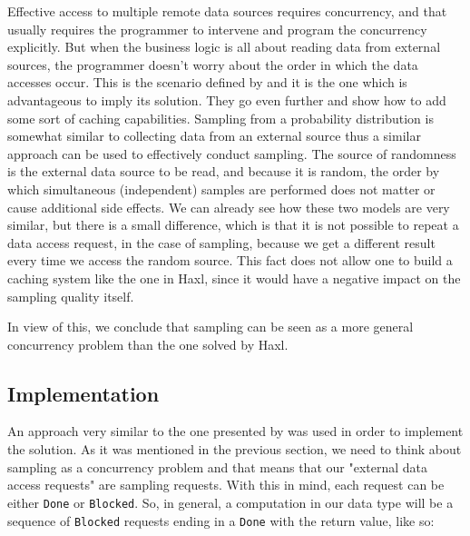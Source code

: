 \documentclass[
  oneside,
  11pt, a4paper,
  footinclude=true,
  headinclude=true,
  cleardoublepage=empty
]{scrbook}
\theoremstyle{definition}
\theoremstyle{definition}
\begin{document}
    Effective access to multiple remote data sources requires concurrency, and that usually requires the programmer to intervene and program the concurrency explicitly. But when the business logic is all about reading data from external sources, the programmer doesn't worry about the order in which the data accesses occur. This is the scenario defined by \cite{Marlow:2014:NFA:2692915.2628144} and it is the one which is advantageous to imply its solution. They go even further and show how to add some sort of caching capabilities. Sampling from a probability distribution is somewhat similar to collecting data from an external source thus a similar approach can be used to effectively conduct sampling. The source of randomness is the external data source to be read, and because it is random, the order by which simultaneous (independent) samples are performed does not matter or cause additional side effects. We can already see how these two models are very similar, but there is a small difference, which is that it is not possible to repeat a data access request, in the case of sampling, because we get a different result every time we access the random source. This fact does not allow one to build a caching system like the one in Haxl, since it would have a negative impact on the sampling quality itself. 
    
    In view of this, we conclude that sampling can be seen as a more general concurrency problem than the one solved by Haxl.
    
    \subsection{Implementation}
    
    An approach very similar to the one presented by \cite{Marlow:2014:NFA:2692915.2628144} was used in order to implement the solution. As it was mentioned in the previous section, we need to think about sampling as a concurrency problem and that means that our "external data access requests" are sampling requests. With this in mind, each request can be either \texttt{Done} or \texttt{Blocked}. So, in general, a computation in our data type will be a sequence of \texttt{Blocked} requests ending in a \texttt{Done} with the return value, like so:
    
\end{document}
